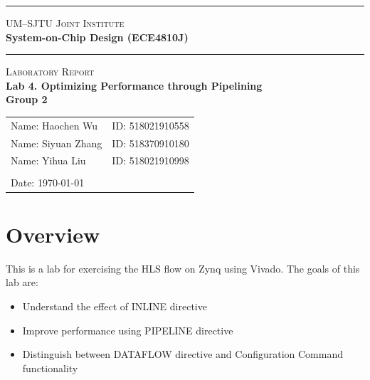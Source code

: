 \documentclass[a4paper]{article}
\begin{document}
\begin{titlepage}
    \vspace*{0.25cm}
    \noindent\rule[0.25\baselineskip]{\textwidth}{1pt}
    \begin{center}
        \huge{\textsc{UM--SJTU Joint Institute}}\vspace{0.3em}\\
        \huge{\textbf{System-on-Chip Design (ECE4810J)}}\vspace{0.3em}\\
        \noindent\rule[0.25\baselineskip]{\textwidth}{1pt}
    \end{center}
    \begin{center}
        \vspace{5cm}
        \Large{\textsc{Laboratory Report}}\vspace{0.5em}\\
        \Large{\textbf{Lab 4. Optimizing Performance through Pipelining}}\vspace{1em}\\
        \Large{\textbf{Group 2}}\\
    \end{center}
    \vfill
    \large
    \begin{tabular}{ll}
        Name: Haochen Wu \hspace*{2em}&ID: 518021910558\hspace*{2em}\\
        Name: Siyuan Zhang \hspace*{2em}&ID: 518370910180 \hspace*{2em}\\
        Name: Yihua Liu \hspace*{2em}&ID: 518021910998\hspace*{2em}\\
        \\
        Date: \today
    \end{tabular}
\end{titlepage}
\tableofcontents
\newpage
\section{Overview}
This is a lab for exercising the HLS flow on Zynq using Vivado. The goals of this lab are:
\begin{itemize}
    \item Understand the effect of INLINE directive
    \item Improve performance using PIPELINE directive
    \item Distinguish between DATAFLOW directive and Configuration Command functionality
\end{itemize}
\end{document}

